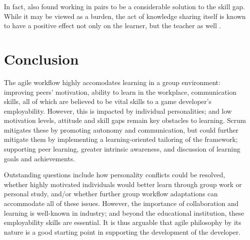 \documentclass{scrartcl}
\begin{document}
In fact, \cite{group2005} also found working in pairs to be a considerable solution to the skill gap. While it may be viewed as a burden, the act of knowledge sharing itself is known to have a positive effect not only on the learner, but the teacher as well \cite{activepassive, motivation}. 

\section{Conclusion}
The agile workflow highly accomodates learning in a group environment: improving peers' motivation, ability to learn in the workplace, communication skills, all of which are believed to be vital skills to a game developer's employability. However, this is impacted by individual personalities; and low motivation levels, attitude and skill gaps remain key obstacles to learning. Scrum mitigates these by promoting autonomy and communication, but could further mitigate them by implementing a learning-oriented tailoring of the framework; supporting peer learning, greater intrinsic awareness, and discussion of learning goals and achievements.

Outstanding questions include how personality conflicts could be resolved, whether highly motivated individuals would better learn through group work or personal study, and/or whether further group workflow adaptations can accommodate all of these issues. However, the importance of collaboration and learning is well-known in industry; and beyond the educational institution, these employability skills are essential. It is thus arguable that agile philosophy by its nature is a good starting point in supporting the development of the developer.


 

\end{document}
